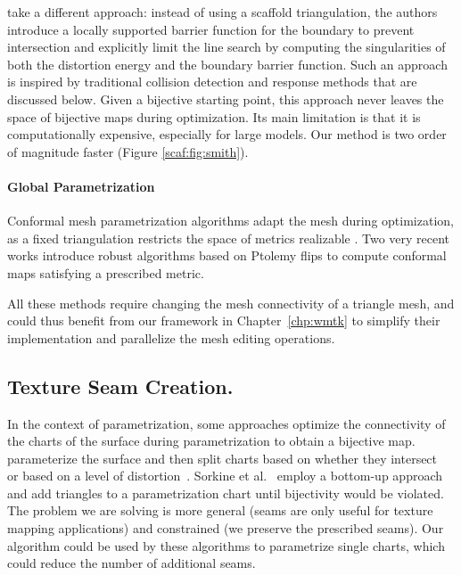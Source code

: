 \citep{Smith:2015} take a different approach: instead of using a scaffold triangulation, the authors introduce a locally supported barrier function for the boundary to prevent intersection and explicitly limit the line search by computing the singularities of both the distortion energy and the boundary barrier function. Such an approach is inspired by traditional collision detection and response methods that are discussed below. Given a  bijective starting point, this approach never leaves the space of bijective maps during optimization.  Its main limitation is that it is computationally expensive, especially for large models. Our method is two order of magnitude faster (Figure \ref{scaf:fig:smith}).

\paragraph{Global Parametrization} 

Conformal mesh parametrization algorithms adapt the mesh during optimization, as a fixed triangulation restricts the space of metrics realizable \cite{luo2004combinatorial,Campen:2017:SimilarityMaps,campen2018seamless,gu2018discrete,gu2018discrete2,springborn2019ideal,sun2015discrete}. Two very recent works \cite{Gillespie:2021:DCE,Campen:2021} introduce robust algorithms based on Ptolemy flips to compute conformal maps satisfying a prescribed metric.

All these methods require changing the mesh connectivity of a triangle mesh, and could thus benefit from our framework in Chapter~\ref{chp:wmtk} to simplify their implementation and parallelize the mesh editing operations. 

\subsection*{Texture Seam Creation.}
In the context of parametrization, some approaches optimize the connectivity of the charts of the surface during parametrization to obtain a bijective map.  \cite{Levy:2002,Zhou:2004} parameterize the surface and then split charts based on whether they intersect~\cite{Levy:2002} or based on a level of distortion~\cite{Zhou:2004}.  Sorkine et al.~\cite{Sorkine:2002} employ a bottom-up approach and add triangles to a parametrization chart until bijectivity would be violated. The problem we are solving is more general (seams are only useful for texture mapping applications) and constrained (we preserve the prescribed seams). Our algorithm could be used by these algorithms to parametrize single charts, which could reduce the number of additional seams.


